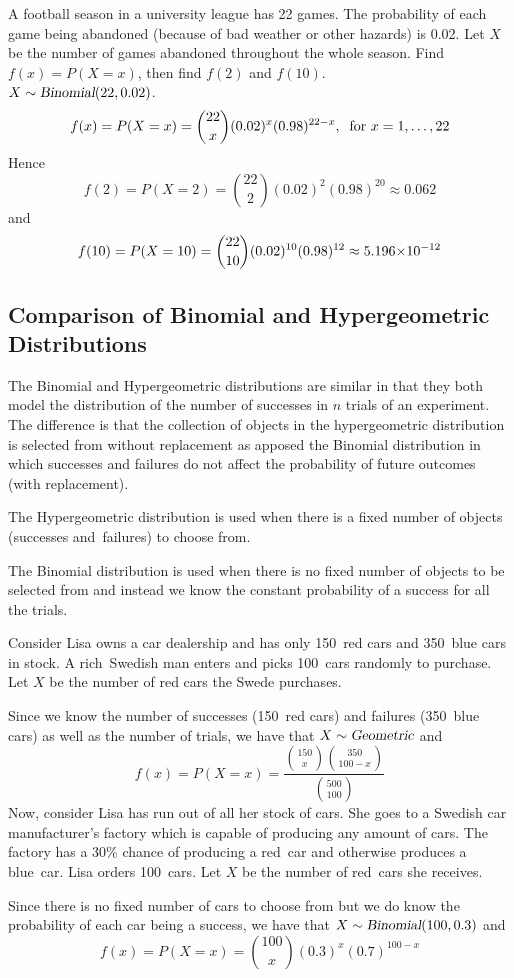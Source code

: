 \begin{example}
A football season in a university league has 22 games. The probability of each game being abandoned (because of bad weather or other hazards) is 0.02. Let $X$ be the number of games abandoned throughout the whole season. Find $f(x)=P(X=x)$, then find $f(2)$ and $f(10)$. \\
$X\sim\operatorname{\textsl{Binomial}}(22,0.02)$.
\[
    f(x) = P(X = x) = \displaystyle\binom{22}{x} (0.02)^x (0.98)^{22-x},\:\text{ for } x = 1,\ldots,22
\]
Hence 
\[
    f(2) = P(X = 2) = \displaystyle\binom{22}{2} (0.02)^2 (0.98)^20 \approx 0.062
\]
and 
\[
    f(10) = P(X = 10) = \displaystyle\binom{22}{10} (0.02)^{10} (0.98)^{12} \approx {5.196}{\times}10^{-12}
\]
\end{example}
\subsection{Comparison of Binomial and Hypergeometric Distributions}
The Binomial and Hypergeometric distributions are similar in that they both model the distribution of the number of successes in $n$ trials of an experiment. The difference is that the collection of objects in the hypergeometric distribution is selected from without replacement as apposed the Binomial distribution in which successes and failures do not affect the probability of future outcomes (with replacement).
\begin{info}
The Hypergeometric distribution is used when there is a fixed number of objects (successes and~failures) to choose from.
\par\smallskip
The Binomial distribution is used when there is no fixed number of objects to be selected from and instead we know the constant probability of a success for all the trials.
\end{info}
\begin{example}
Consider Lisa owns a car dealership and has only 150~red cars and 350~blue cars in stock. A rich~Swedish man enters and picks 100~cars randomly to purchase. Let $X$ be the number of red cars the Swede purchases.
\par\smallskip
Since we know the number of successes (150~red cars) and failures (350~blue cars) as well as the number of trials, we have that $X \sim \operatorname{\textsl{Geometric}}$ and 
\[
    f(x) = P(X = x) = \frac{\binom{150}{x} \binom{350}{100-x}}{\binom{500}{100}}
\]
Now, consider Lisa has run out of all her stock of cars. She goes to a Swedish car manufacturer's factory which is capable of producing any amount of cars. The factory has a 30\% chance of producing a red~car and otherwise produces a blue~car. Lisa orders 100~cars. Let $X$ be the number of red~cars she receives.
\par\smallskip
Since there is no fixed number of cars to choose from but we do know the probability of each car being a success, we have that $X \sim \operatorname{\textsl{Binomial}}(100, 0.3)$ and
\[
    f(x) = P(X = x) = \binom{100}{x} (0.3)^{x} (0.7)^{100-x}
\]
\end{example}